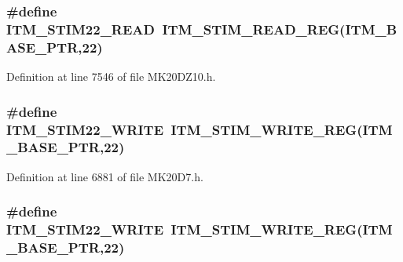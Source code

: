 \subsubsection[{\texorpdfstring{I\+T\+M\+\_\+\+S\+T\+I\+M22\+\_\+\+R\+E\+AD}{ITM_STIM22_READ}}]{\setlength{\rightskip}{0pt plus 5cm}\#define I\+T\+M\+\_\+\+S\+T\+I\+M22\+\_\+\+R\+E\+AD~{\bf I\+T\+M\+\_\+\+S\+T\+I\+M\+\_\+\+R\+E\+A\+D\+\_\+\+R\+EG}({\bf I\+T\+M\+\_\+\+B\+A\+S\+E\+\_\+\+P\+TR},22)}\hypertarget{group___i_t_m___register___accessor___macros_ga65cc639289ac0f598f937c573ed5abde}{}\label{group___i_t_m___register___accessor___macros_ga65cc639289ac0f598f937c573ed5abde}


Definition at line 7546 of file M\+K20\+D\+Z10.\+h.

\subsubsection[{\texorpdfstring{I\+T\+M\+\_\+\+S\+T\+I\+M22\+\_\+\+W\+R\+I\+TE}{ITM_STIM22_WRITE}}]{\setlength{\rightskip}{0pt plus 5cm}\#define I\+T\+M\+\_\+\+S\+T\+I\+M22\+\_\+\+W\+R\+I\+TE~{\bf I\+T\+M\+\_\+\+S\+T\+I\+M\+\_\+\+W\+R\+I\+T\+E\+\_\+\+R\+EG}({\bf I\+T\+M\+\_\+\+B\+A\+S\+E\+\_\+\+P\+TR},22)}\hypertarget{group___i_t_m___register___accessor___macros_ga7733147e8939d83fbea163a3d3c181d4}{}\label{group___i_t_m___register___accessor___macros_ga7733147e8939d83fbea163a3d3c181d4}


Definition at line 6881 of file M\+K20\+D7.\+h.

\subsubsection[{\texorpdfstring{I\+T\+M\+\_\+\+S\+T\+I\+M22\+\_\+\+W\+R\+I\+TE}{ITM_STIM22_WRITE}}]{\setlength{\rightskip}{0pt plus 5cm}\#define I\+T\+M\+\_\+\+S\+T\+I\+M22\+\_\+\+W\+R\+I\+TE~{\bf I\+T\+M\+\_\+\+S\+T\+I\+M\+\_\+\+W\+R\+I\+T\+E\+\_\+\+R\+EG}({\bf I\+T\+M\+\_\+\+B\+A\+S\+E\+\_\+\+P\+TR},22)}\hypertarget{group___i_t_m___register___accessor___macros_ga7733147e8939d83fbea163a3d3c181d4}{}\label{group___i_t_m___register___accessor___macros_ga7733147e8939d83fbea163a3d3c181d4}


